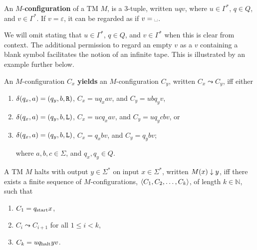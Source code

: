 \begin{definition} An $M$-\textbf{configuration} of a TM $M$, is a 3-tuple,
written $uqv$, where $u\in\Gamma^*$, $q\in Q$, and $v\in\Gamma^*$. If
$v=\varepsilon$, it can be regarded as if $v=\blank$. \end{definition}

We will omit stating that $u\in\Gamma^*$, $q\in Q$, and $v\in\Gamma^*$ when
this is clear from context. The additional permission to regard an empty $v$ as
a $v$ containing a blank symbol facilitates the notion of an infinite tape.
This is illustrated by an example further below.

\begin{definition} An $M$-configuration $C_x$ \textbf{yields} an
$M$-configuration $C_y$, written $C_x\leadsto C_y$, iff either

\begin{enumerate}

\item $\delta\mathopen{}\left({q_x,a}\right)\mathclose{}=\mathopen{}\left({q_y,b,\mathtt{R}}\right)\mathclose{}$, $C_x=uq_xav$, and $C_y=ubq_yv$,

\item $\delta\mathopen{}\left({q_x,a}\right)\mathclose{}=\mathopen{}\left({q_y,b,\mathtt{L}}\right)\mathclose{}$, $C_x=ucq_xav$, and $C_y=uq_ycbv$,
or

\item $\delta\mathopen{}\left({q_x,a}\right)\mathclose{}=\mathopen{}\left({q_y,b,\mathtt{L}}\right)\mathclose{}$, $C_x=q_xbv$,  and $C_y=q_ybv$;

where $a,b,c\in\Sigma$, and $q_x,q_y\in Q$.

\end{enumerate}

\end{definition}

\begin{definition}

A TM $M$ halts with output $y\in\Sigma^*$ on input $x\in\Sigma^*$, written
$M\mathopen{}\left({x}\right)\mathclose{}\downarrow y$, iff there exists a finite sequence of $M$-configurations,
$\mathopen{}\left\langle{C_1,C_2,\ldots, C_k}\right\rangle\mathclose{}$, of length $k\in\mathbb{N}$, such that

\begin{enumerate}

\item $C_1=q_{\text{start}} x$,

\item $C_i\leadsto C_{i+1}$ for all $1\leq i < k$,

\item $C_k=uq_{\text{halt}} yv$.

\end{enumerate}

\end{definition}

